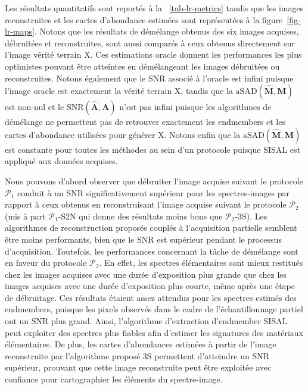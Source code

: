Les résultats quantitatifs sont reportés à la \tabname~\ref{tab-lr-metrics} tandis que les images reconstruites et les cartes d'abondance estimées sont représentées à la figure~\ref{fig-lr-maps}. Notons que les résultats de démélange obtenus des six images acquises, débruitées et reconstruites, sont aussi comparés à ceux obtenus directement sur l'image vérité terrain \gls{X}. Ces estimations oracle donnent les performances les plus optimistes pouvant être atteintes en démélangeant les images débruitées ou reconstruites. Notons également que le SNR associé à l'oracle est infini puisque l'image oracle est exactement la vérité terrain \gls{X}, tandis que la $\mathrm{aSAD}(\hat{\mathbf{M}}, \mathbf{M})$ est non-nul et le $\mathrm{SNR}(\hat{\mathbf{A}}, \mathbf{A})$ n'est pas infini puisque les algorithmes de démélange ne permettent pas de retrouver exactement les endmembers et les cartes d'abondance utilisées pour générer \gls{X}. Notons enfin que la $\mathrm{aSAD}(\hat{\mathbf{M}}, \mathbf{M})$ est constante pour toutes les méthodes au sein d'un protocole puisque SISAL est appliqué aux données acquises.

Nous pouvons d'abord observer que débruiter l'image acquise suivant le protocole $\mathcal{P}_1$ conduit à un SNR significativement supérieur pour les spectres-images par rapport à ceux obtenus en reconstruisant l'image acquise suivant le protocole $\mathcal{P}_2$ (mis à part $\mathcal{P}_1$-S2N qui donne des résultats moins bons que $\mathcal{P}_2$-3S). Les algorithmes de reconstruction proposés couplés à l'acquisition partielle semblent être moins performants, bien que le SNR est supérieur pendant le processus d'acquisition. Toutefois, les performances concernant la tâche de démélange sont en faveur du protocole $\mathcal{P}_2$. En effet, les spectres élémentaires sont mieux restitués chez les images acquises avec une durée d'exposition plus grande que chez les images acquises avec une durée d'exposition plus courte, même après une étape de débruitage. Ces résultats étaient assez attendus pour les spectres estimés des endmembers, puisque les pixels observés dans le cadre de l'échantillonnage partiel ont un SNR plus grand. Ainsi, l'algorithme d'extraction d'endmember SISAL peut exploiter des spectres plus fiables afin d'estimer les signatures des matériaux élémentaires. De plus, les cartes d'abondances estimées à partir de l'image reconstruite par l'algorithme proposé 3S permettent d'atteindre un SNR supérieur, prouvant que cette image reconstruite peut être exploitée avec confiance pour cartographier les éléments du spectre-image.

